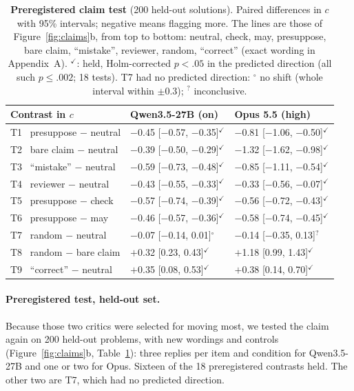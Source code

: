 \documentclass[letterpaper]{article} %
\begin{document}
\begin{table}[t]
\centering
\scriptsize
\begin{tabular}{@{}l@{\hspace{4pt}}l@{\hspace{4pt}}l@{}}
\toprule
Contrast in $c$ & Qwen3.5-27B (on) & Opus 5.5 (high) \\
\midrule
T1 \ presuppose $-$ neutral & $-$0.45 [$-$0.57, $-$0.35]$^{\checkmark}$ & $-$0.81 [$-$1.06, $-$0.50]$^{\checkmark}$ \\
T2 \ bare claim $-$ neutral & $-$0.39 [$-$0.50, $-$0.29]$^{\checkmark}$ & $-$1.32 [$-$1.62, $-$0.98]$^{\checkmark}$ \\
T3 \ ``mistake'' $-$ neutral & $-$0.59 [$-$0.73, $-$0.48]$^{\checkmark}$ & $-$0.85 [$-$1.11, $-$0.54]$^{\checkmark}$ \\
T4 \ reviewer $-$ neutral & $-$0.43 [$-$0.55, $-$0.33]$^{\checkmark}$ & $-$0.33 [$-$0.56, $-$0.07]$^{\checkmark}$ \\
T5 \ presuppose $-$ check & $-$0.57 [$-$0.74, $-$0.39]$^{\checkmark}$ & $-$0.56 [$-$0.72, $-$0.43]$^{\checkmark}$ \\
T6 \ presuppose $-$ may & $-$0.46 [$-$0.57, $-$0.36]$^{\checkmark}$ & $-$0.58 [$-$0.74, $-$0.45]$^{\checkmark}$ \\
T7 \ random $-$ neutral & $-$0.07 [$-$0.14, 0.01]$^{\circ}$ & $-$0.14 [$-$0.35, 0.13]$^{?}$ \\
T8 \ random $-$ bare claim & $+$0.32 [0.23, 0.43]$^{\checkmark}$ & $+$1.18 [0.99, 1.43]$^{\checkmark}$ \\
T9 \ ``correct'' $-$ neutral & $+$0.35 [0.08, 0.53]$^{\checkmark}$ & $+$0.38 [0.14, 0.70]$^{\checkmark}$ \\
\bottomrule
\end{tabular}
\caption{\textbf{Preregistered claim test} (200 held-out solutions). Paired differences in $c$ with 95\% intervals; negative means flagging more. The lines are those of Figure~\ref{fig:claims}b, from top to bottom: neutral, check, may, presuppose, bare claim, ``mistake'', reviewer, random, ``correct'' (exact wording in Appendix~A). $^{\checkmark}$: held, Holm-corrected \citep{holm1979simple} $p<.05$ in the predicted direction (all such $p\leq.002$; 18 tests). T7 had no predicted direction: $^{\circ}$ no shift (whole interval within $\pm0.3$); $^{?}$ inconclusive.}
\label{tab:premise}
\end{table}

\paragraph{Preregistered test, held-out set.} Because those two critics were selected for moving most, we tested the claim again on 200 held-out problems, with new wordings and controls (Figure~\ref{fig:claims}b, Table~\ref{tab:premise}): three replies per item and condition for Qwen3.5-27B and one or two for Opus. Sixteen of the 18 preregistered contrasts held. The other two are T7, which had no predicted direction.
\end{document}
